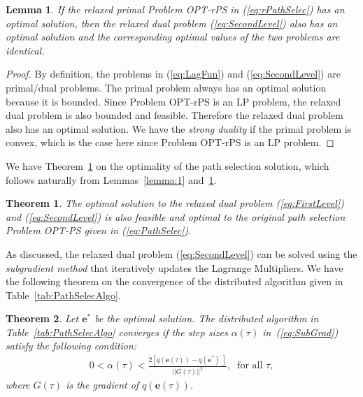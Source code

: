 \documentclass[12pt,onecolumn,draftclsnofoot]{IEEEtran} %
\newtheorem{theorem}{Theorem}
\newtheorem{lemma}{Lemma}
\begin{document}
\smallskip
\begin{lemma} \label{lemma:2}
If the relaxed primal Problem OPT-rPS in (\ref{eq:rPathSelec}) has an optimal solution, then the relaxed dual problem (\ref{eq:SecondLevel}) also has an optimal solution and the corresponding optimal values of the two problems are identical.
\end{lemma}
%
\begin{proof}
By definition, the problems in (\ref{eq:LagFun}) and (\ref{eq:SecondLevel}) are primal/dual problems.  The primal problem always has an optimal solution because it is bounded. Since Problem OPT-rPS is an LP problem, the relaxed dual problem is also bounded and feasible. Therefore the relaxed dual problem also has an optimal solution.  We have the {\em strong duality} if the primal problem is convex, which is the case here since Problem OPT-rPS is an LP problem. 
\end{proof}

We have Theorem~\ref{th:th2} on the optimality of the path selection solution, which follows naturally from Lemmas~\ref{lemma:1} and~\ref{lemma:2}.
\smallskip
\begin{theorem} \label{th:th2}
The optimal solution to the relaxed dual problem (\ref{eq:FirstLevel}) and (\ref{eq:SecondLevel}) is also feasible and optimal to the original path selection Problem OPT-PS given in (\ref{eq:PathSelec}). 
\end{theorem}

As discussed, the relaxed dual problem (\ref{eq:SecondLevel}) can be solved using the {\em subgradient method} that iteratively updates the Lagrange Multipliers.  We have the following theorem on the convergence of the distributed algorithm given in Table~\ref{tab:PathSelecAlgo}. 
\smallskip
\begin{theorem} 
Let $\mathbf{e}^{\ast}$ be the optimal solution.  The distributed algorithm in Table~\ref{tab:PathSelecAlgo} converges if the step sizes $\alpha(\tau)$ in~(\ref{eq:SubGrad}) satisfy the following condition:
\begin{eqnarray}\label{eq:StepSize}
  0 < \alpha(\tau) < \frac{2 \left[ q(\mathbf{e}(\tau))-q(\mathbf{e}^{\ast}) \;
       \right]}{||G(\tau)||^2}, \;\; \mbox{for all } \tau,
\end{eqnarray}
where $G(\tau)$ is the gradient of $q(\mathbf{e}(\tau))$. 
\end{theorem}
\end{document}
